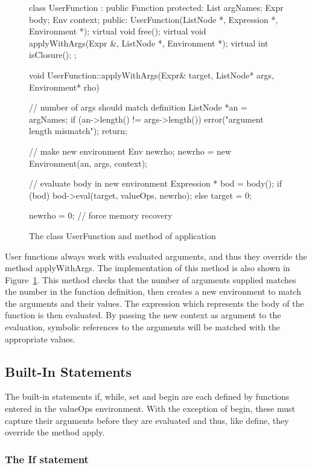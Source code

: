 \begin{figure}
\begin{cprog}
class UserFunction : public Function {
protected:
	List argNames;
	Expr body;
	Env context;
public:
	UserFunction(ListNode *, Expression *, Environment *);
	virtual void free();
	virtual void applyWithArgs(Expr &, ListNode *, Environment *);
	virtual int isClosure();
};

void UserFunction::applyWithArgs(Expr& target, ListNode* args, Environment* rho)
{
	// number of args should match definition
	ListNode *an = argNames;
	if (an->length() != args->length()) {
		error("argument length mismatch");
		return;
		}

	// make new environment
	Env newrho; 
	newrho = new Environment(an, args, context);

	// evaluate body in new environment
	Expression * bod = body();
	if (bod)
		bod->eval(target, valueOps, newrho);
	else
		target = 0;

	newrho = 0;	// force memory recovery
}
\end{cprog}
\caption{The class {\sf UserFunction} and method of application}\label{userfunction}
\end{figure}

User functions always work with evaluated arguments, and thus they override
the method {\sf applyWithArgs}.   The implementation of this method is
also shown in Figure~\ref{userfunction}.  This method checks that the
number of arguments supplied matches the number in the function definition,
then creates a new environment to match the arguments and their values.
The expression which represents the body of the function is then evaluated.
By passing the new context as argument to the evaluation, symbolic
references to the arguments will be matched with the appropriate values.

\subsection{Built-In Statements}

The built-in statements {\sf if, while, set} and {\sf begin} are each
defined by functions entered in the {\sf valueOps} environment.
With the exception of {\sf begin}, these must capture their arguments
before they are evaluated and thus, like {\sf define}, they override the
method {\sf apply}.

\subsubsection{The If statement}


